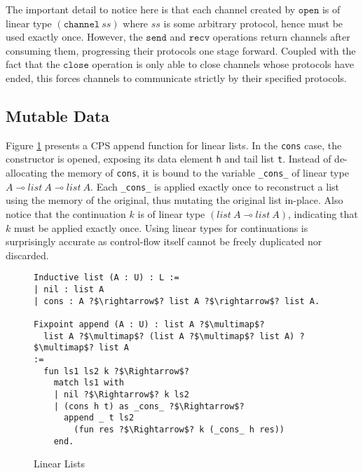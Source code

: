 \documentclass[sigplan,screen,review,anonymous]{acmart}
\newcommand{\channel}{\texttt{channel}}
\newcommand{\open}{\texttt{open}}
\newcommand{\close}{\texttt{close}}
\newcommand{\send}{\texttt{send}}
\newcommand{\recv}{\texttt{recv}}
\begin{document}
The important detail to notice here is that each channel created by $\open$ is of linear type $(\channel\ ss)$ where $ss$ is some arbitrary protocol, hence must be used exactly once. However, the $\send$ and $\recv$ operations return channels after consuming them, progressing their protocols one stage forward. Coupled with the fact that the $\close$ operation is only able to close channels whose protocols have ended, this forces channels to communicate strictly by their specified protocols.

\subsection{Mutable Data}
Figure \ref{list} presents a CPS append function for linear lists. In the \texttt{cons} case, the constructor is opened, exposing its data element \texttt{h} and tail list \texttt{t}. Instead of de-allocating the memory of \texttt{cons}, it is bound to the variable \texttt{_cons_} of linear type $A \multimap list\ A \multimap list\ A$. Each \texttt{_cons_} is applied exactly once to reconstruct a list using the memory of the original, thus mutating the original list in-place. Also notice that the continuation $k$ is of linear type $(list\ A \multimap list\ A)$, indicating that $k$ must be applied exactly once. Using linear types for continuations is surprisingly accurate as control-flow itself cannot be freely duplicated nor discarded.

\begin{figure}[h]
  \caption{Linear Lists}
  \begin{verbatim}
Inductive list (A : U) : L :=
| nil : list A
| cons : A ?$\rightarrow$? list A ?$\rightarrow$? list A.

Fixpoint append (A : U) : list A ?$\multimap$? 
  list A ?$\multimap$? (list A ?$\multimap$? list A) ?$\multimap$? list A 
:=
  fun ls1 ls2 k ?$\Rightarrow$?
    match ls1 with
    | nil ?$\Rightarrow$? k ls2
    | (cons h t) as _cons_ ?$\Rightarrow$?
      append _ t ls2 
        (fun res ?$\Rightarrow$? k (_cons_ h res))
    end.
  \end{verbatim}
  \label{list}
  \Description{}
\end{figure}
\end{document}
